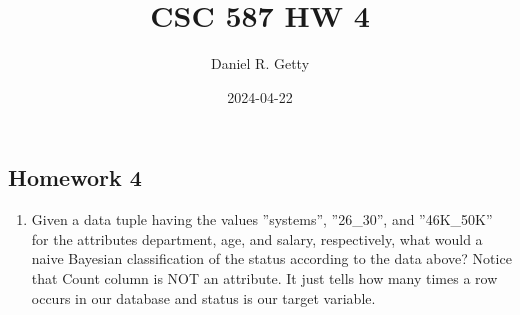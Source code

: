 \documentclass[
]{article}
\title{CSC 587 HW 4}
\author{Daniel R. Getty}
\date{2024-04-22}
\providecommand{\tightlist}{%
  \setlength{\itemsep}{0pt}\setlength{\parskip}{0pt}}
\begin{document}
\maketitle

\hypertarget{homework-4}{%
\subsection{Homework 4}\label{homework-4}}

\begin{enumerate}
\def\labelenumi{\arabic{enumi}.}
\tightlist
\item
  Given a data tuple having the values ''systems'', ''26\_30'', and
  ''46K\_50K'' for the attributes department, age, and salary,
  respectively, what would a naive Bayesian classification of the status
  according to the data above? Notice that Count column is NOT an
  attribute. It just tells how many times a row occurs in our database
  and status is our target variable.
\end{enumerate}
\end{document}
